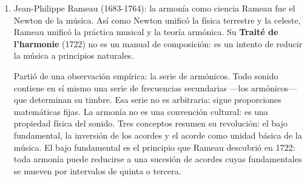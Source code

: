 \documentclass[14pt, a4paper]{article}
\begin{document}
\begin{enumerate}
\begin{verbatim}
// Voz 4 (bajo) - entra en la octava inferior
~voz4 = Pbind(
    \instrument, \organo6,
    \midinote, Pseq([48, 52, 55, 60, 59, 55, 57, 53, 55, 52, 50, 48], 1),
    \dur, Pseq([0.5, 0.5, 0.5, 1.0, 0.5, 0.5, 0.5, 0.5, 1.0, 0.5, 0.5, 1.0], 1),
    \amp, 0.06,
    \pan, 0
);

// Voz 5 - contrasujeto libre
~voz5 = Pbind(
    \instrument, \organo6,
    \midinote, Pseq([64, 62, 60, 59, 57, 60, 62, 64, 65, 67, 69, 67], 1),
    \dur, Pseq([0.25, 0.25, 0.5, 0.5, 0.5, 0.5, 0.5, 0.5, 0.5, 0.5, 0.5, 1.0], 1),
    \amp, 0.04,
    \pan, -0.6
);

// Voz 6 - pedal grave
~voz6 = Pbind(
    \instrument, \organo6,
    \midinote, Pseq([36, 36, 36, 36, 43, 43, 43, 43, 48, 48, 48, 48], 1),
    \dur, Pseq([1.0, 1.0, 1.0, 1.0, 1.0, 1.0, 1.0, 1.0, 1.0, 1.0, 1.0, 1.0], 1),
    \amp, 0.07,
    \pan, 0.6
);

// Iniciar las seis voces en stretto
("=== Fuga a seis voces ===").postln;
("Voz 1: Soprano").postln;
~p1 = ~voz1.play;

1.5.wait;
("Voz 2: Contralto (respuesta)").postln;
~p2 = ~voz2.play;

1.5.wait;
("Voz 3: Tenor").postln;
~p3 = ~voz3.play;

1.5.wait;
("Voz 4: Bajo").postln;
~p4 = ~voz4.play;

1.5.wait;
("Voz 5: Contrasujeto libre").postln;
~p5 = ~voz5.play;

1.5.wait;
("Voz 6: Pedal grave").postln;
~p6 = ~voz6.play;
)

// Para detener todas las voces:
// ~p1.stop; ~p2.stop; ~p3.stop; ~p4.stop; ~p5.stop; ~p6.stop;
\end{verbatim}
\item Jean-Philippe Rameau (1683-1764): la armonía como ciencia
\label{rameau-siglo-xviii}
Rameau fue el Newton de la música. Así como Newton unificó la física
terrestre y la celeste, Rameau unificó la práctica musical y la teoría
armónica. Su \textbf{Traité de l'harmonie} (1722) no es un manual de
composición: es un intento de reducir la música a principios
naturales.

Partió de una observación empírica: la serie de armónicos. Todo sonido
contiene en sí mismo una serie de frecuencias secundarias —los
armónicos— que determinan su timbre. Esa serie no es arbitraria: sigue
proporciones matemáticas fijas. La armonía no es una convención
cultural: es una propiedad física del sonido. Tres conceptos resumen
su revolución: el bajo fundamental, la inversión de los acordes y el
acorde como unidad básica de la música. El bajo fundamental es el
principio que Rameau descubrió en 1722: toda armonía puede reducirse a
una sucesión de acordes cuyas fundamentales se mueven por intervalos
de quinta o tercera.


\end{enumerate}
\end{document}
